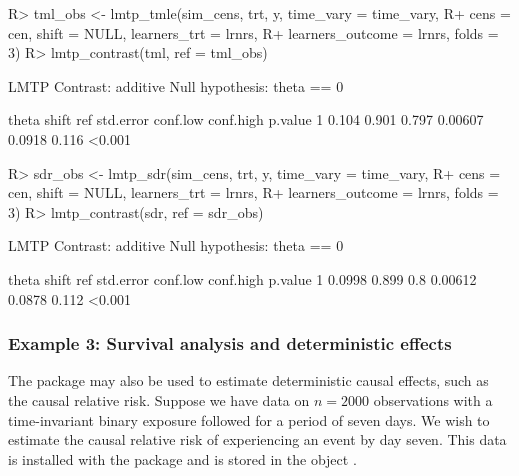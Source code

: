 \documentclass[]{jss}
\begin{document}
\begin{CodeChunk}

\begin{CodeInput}
R> tml_obs <- lmtp_tmle(sim_cens, trt, y, time_vary = time_vary, 
R+                      cens = cen, shift = NULL, learners_trt = lrnrs, 
R+                      learners_outcome = lrnrs, folds = 3)
R> lmtp_contrast(tml, ref = tml_obs)
\end{CodeInput}

\begin{CodeOutput}
  LMTP Contrast: additive
Null hypothesis: theta == 0

  theta shift   ref std.error conf.low conf.high p.value
1 0.104 0.901 0.797   0.00607   0.0918     0.116  <0.001
\end{CodeOutput}

\begin{CodeInput}
R> sdr_obs <- lmtp_sdr(sim_cens, trt, y, time_vary = time_vary, 
R+                     cens = cen, shift = NULL, learners_trt = lrnrs, 
R+                     learners_outcome = lrnrs, folds = 3)
R> lmtp_contrast(sdr, ref = sdr_obs)
\end{CodeInput}

\begin{CodeOutput}
  LMTP Contrast: additive
Null hypothesis: theta == 0

   theta shift ref std.error conf.low conf.high p.value
1 0.0998 0.899 0.8   0.00612   0.0878     0.112  <0.001
\end{CodeOutput}

\end{CodeChunk}

\hypertarget{example-3-survival-analysis-and-deterministic-effects}{%
\subsubsection{Example 3: Survival analysis and deterministic effects}\label{example-3-survival-analysis-and-deterministic-effects}}

The  package may also be used to estimate deterministic causal effects, such as the causal relative risk.
Suppose we have data on \(n = 2000\) observations with a time-invariant binary exposure followed for a
period of seven days. We wish to estimate the causal relative risk of experiencing an event by day seven. This data is
installed with the package and is stored in the object . 
\end{document}
